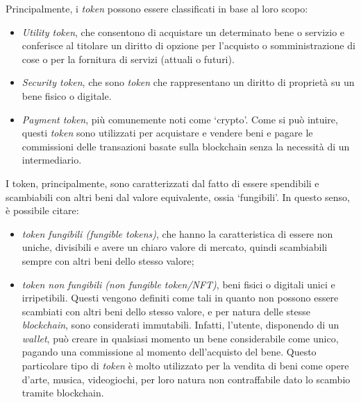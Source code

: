 Principalmente, i \textit{token} possono essere classificati in base al loro scopo:
\begin{itemize}
    \item \textit{Utility token}, che consentono di acquistare un determinato bene o servizio e conferisce al titolare un diritto di opzione per l'acquisto o somministrazione di cose o per la fornitura di servizi (attuali o futuri). 
    \item \textit{Security token}, che sono \textit{token} che rappresentano un diritto di proprietà su un bene fisico o digitale.
    \item \textit{Payment token}, più comunemente noti come `crypto'. Come si può intuire, questi \textit{token} sono utilizzati per acquistare e vendere beni e pagare le commissioni delle transazioni basate sulla blockchain senza la necessità di un intermediario.
\end{itemize}

I token, principalmente, sono caratterizzati dal fatto di essere spendibili e scambiabili con altri beni dal valore equivalente, ossia `fungibili'.
In questo senso, è possibile citare:
\begin{itemize}
    \item \textit{token fungibili (fungible tokens)}, che hanno la caratteristica di essere non uniche, divisibili e avere un chiaro valore di mercato, quindi scambiabili sempre con altri beni dello stesso valore;
    \item \textit{token non fungibili (non fungible token/NFT)}, beni fisici o digitali unici e irripetibili. Questi vengono definiti come tali in quanto non possono essere scambiati con altri beni dello stesso valore,
    e per natura delle stesse \textit{blockchain}, sono considerati immutabili. Infatti, l'utente, disponendo di un \textit{wallet}, può creare in qualsiasi momento un bene considerabile come unico, pagando una commissione al momento dell'acquisto del bene.
    Questo particolare tipo di \textit{token} è molto utilizzato per la vendita di beni come opere d'arte, musica, videogiochi, per loro natura non contraffabile dato lo scambio tramite blockchain.
\end{itemize}

